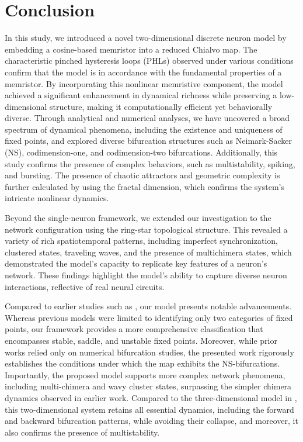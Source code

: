 \documentclass{article}
\begin{document}
\section{Conclusion}

In this study, we introduced a novel two-dimensional discrete neuron model by embedding a cosine-based memristor into a reduced Chialvo map. The characteristic pinched hysteresis loops (PHLs) observed under various conditions confirm that the model is in accordance with the fundamental properties of a memristor. By incorporating this nonlinear memristive component, the model achieved a significant enhancement in dynamical richness while preserving a low-dimensional structure, making it computationally efficient yet behaviorally diverse. Through analytical and numerical analyses, we have uncovered a broad spectrum of dynamical phenomena, including the existence and uniqueness of fixed points, and explored diverse bifurcation structures such as Neimark-Sacker (NS), codimension-one, and codimension-two bifurcations. Additionally, this study confirms the presence of complex behaviors, such as multistability, spiking, and bursting. The presence of chaotic attractors and geometric complexity is further calculated by using the fractal dimension, which confirms the system's intricate nonlinear dynamics.

Beyond the single-neuron framework, we extended our investigation to the network configuration using the ring-star topological structure. This revealed a variety of rich spatiotemporal patterns, including imperfect synchronization, clustered states, traveling waves, and the presence of multichimera states, which demonstrated the model's capacity to replicate key features of a neuron's network. These findings highlight the model's ability to capture diverse neuron interactions, reflective of real neural circuits.

Compared to earlier studies such as \cite{muni2022dynamical,kumar2026study}, our model presents notable advancements. Whereas previous models were limited to identifying only two categories of fixed points, our framework provides a more comprehensive classification that encompasses stable, saddle, and unstable fixed points. Moreover, while prior works relied only on numerical bifurcation studies, the presented work rigorously establishes the conditions under which the map exhibits the NS-bifurcations. Importantly, the proposed model supports more complex network phenomena, including multi-chimera and wavy cluster states, surpassing the simpler chimera dynamics observed in earlier work. Compared to the three-dimensional model in \cite{muni2022dynamical}, this two-dimensional system retains all essential dynamics, including the forward and backward bifurcation patterns, while avoiding their collapse, and moreover, it also confirms the presence of multistability.   
\end{document}
